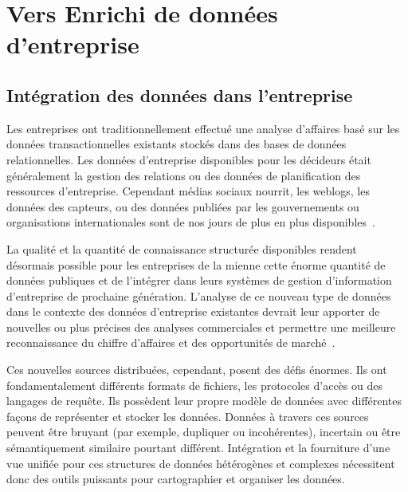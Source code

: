 \documentclass[a4paper,11pt,twoside]{ThesisStyle}
\begin{document}
\let\cleardoublepage\clearpage
\chapter{Vers Enrichi de données d'entreprise}\label{chapter:2}

\section{Intégration des données dans l'entreprise}\label{chapter:rubix}
Les entreprises ont traditionnellement effectué une analyse d'affaires basé sur les données transactionnelles existants stockés dans des bases de données relationnelles. Les données d'entreprise disponibles pour les décideurs était généralement la gestion des relations ou des données de planification des ressources d'entreprise. Cependant médias sociaux nourrit, les weblogs, les données des capteurs, ou des données publiées par les gouvernements ou organisations internationales sont de nos jours de plus en plus disponibles~\cite{Boyd:Article:11}.

La qualité et la quantité de connaissance structurée disponibles rendent désormais possible pour les entreprises de la mienne cette énorme quantité de données publiques et de l'intégrer dans leurs systèmes de gestion d'information d'entreprise de prochaine génération. L'analyse de ce nouveau type de données dans le contexte des données d'entreprise existantes devrait leur apporter de nouvelles ou plus précises des analyses commerciales et permettre une meilleure reconnaissance du chiffre d'affaires et des opportunités de marché~\cite{LaValle:MIT:11}.

Ces nouvelles sources distribuées, cependant, posent des défis énormes. Ils ont fondamentalement différents formats de fichiers, les protocoles d'accès ou des langages de requête. Ils possèdent leur propre modèle de données avec différentes façons de représenter et stocker les données. Données à travers ces sources peuvent être bruyant (par exemple, dupliquer ou incohérentes), incertain ou être sémantiquement similaire pourtant différent. Intégration et la fourniture d'une vue unifiée pour ces structures de données hétérogènes et complexes nécessitent donc des outils puissants pour cartographier et organiser les données.
\end{document}
